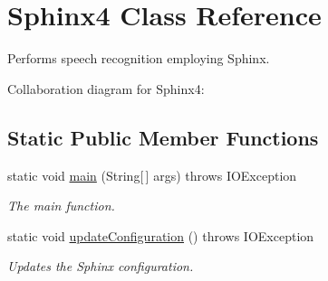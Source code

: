 \hypertarget{classSphinx4}{\section{Sphinx4 Class Reference}
\label{classSphinx4}
}


Performs speech recognition employing Sphinx.  




Collaboration diagram for Sphinx4\-:
\subsection*{Static Public Member Functions}
\begin{DoxyCompactItemize}
\item 
static void \hyperlink{classSphinx4_aef64fe2e07f6ae4013fc64112ccedd17}{main} (String\mbox{[}$\,$\mbox{]} args)  throws I\-O\-Exception 
\begin{DoxyCompactList}\small\item\em The main function. \end{DoxyCompactList}\item 
static void \hyperlink{classSphinx4_aba08f44441901e354030366cd6f431e9}{update\-Configuration} ()  throws I\-O\-Exception
\begin{DoxyCompactList}\small\item\em Updates the Sphinx configuration. \end{DoxyCompactList}\end{DoxyCompactItemize}
